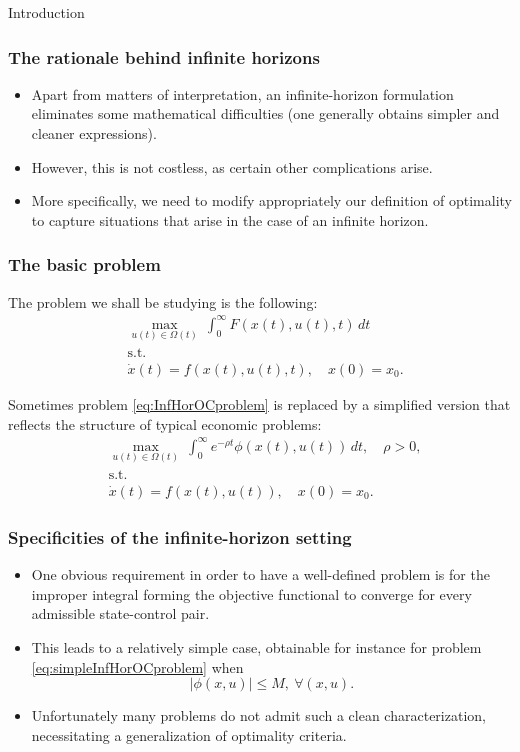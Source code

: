 \documentclass[10pt]{beamer}
\theoremstyle{definition}
\begin{document}
\begin{section}{Introduction}
\begin{frame}[fragile]
\frametitle{The rationale behind infinite horizons}
\begin{itemize}\itemsep1em
\item Apart from matters of interpretation, an infinite-horizon formulation eliminates some mathematical difficulties (one generally obtains simpler and cleaner expressions).
\item However, this is not costless, as certain other complications arise.
\item More specifically, we need to modify appropriately our definition of optimality to capture situations that arise in the case of an infinite horizon.
\end{itemize}
\end{frame}

\begin{frame}[fragile]
\frametitle{The basic problem}
The problem we shall be studying is the following:
\begin{equation}\begin{split}
&\max_{u(t)\in \Omega(t)}~\int_{0}^{\infty}F(x(t),u(t),t)\,dt\\
&\text{s.t.}\\
&\dot{x}(t)=f(x(t),u(t),t),\quad x(0)=x_0.
\end{split}
\label{eq:InfHorOCproblem}
\end{equation}

Sometimes problem \eqref{eq:InfHorOCproblem} is replaced by a simplified version that reflects the structure of typical economic problems:
\begin{equation}\begin{split}
&\max_{u(t)\in \Omega(t)}~\int_{0}^{\infty}e^{-\rho t} \phi(x(t),u(t))\,dt, \quad \rho>0,\\
&\text{s.t.}\\
&\dot{x}(t)=f(x(t),u(t)),\quad x(0)=x_0.
\end{split}
\label{eq:simpleInfHorOCproblem}
\end{equation}
\end{frame}

\begin{frame}[fragile]
\frametitle{Specificities of the infinite-horizon setting}
\begin{itemize}\itemsep1em
\item One obvious requirement in order to have a well-defined problem is for the improper integral forming the objective functional to converge for every admissible state-control pair.
\item This leads to a relatively simple case, obtainable for instance for problem \eqref{eq:simpleInfHorOCproblem} when \[ |\phi(x,u)|\leq M,~\forall (x,u). \]
\item Unfortunately many problems do not admit such a clean characterization, necessitating a generalization of optimality criteria.
\end{itemize}
\end{frame}


\end{section}
\end{document}
